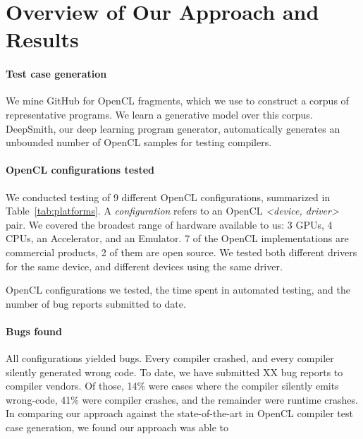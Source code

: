 \section{Overview of Our Approach and Results}\label{sec:overview}

\paragraph{Test case generation} We mine GitHub for OpenCL fragments, which we use to construct a corpus of representative programs. We learn a generative model over this corpus. DeepSmith, our deep learning program generator, automatically generates an unbounded number of OpenCL samples for testing compilers.

\paragraph{OpenCL configurations tested} We conducted testing of 9 different OpenCL configurations, summarized in Table~\ref{tab:platforms}. A \emph{configuration} refers to an OpenCL \emph{<device, driver>} pair. We covered the broadest range of hardware available to us: 3 GPUs, 4 CPUs, an Accelerator, and an Emulator. 7 of the OpenCL implementations are commercial products, 2 of them are open source. We tested both different drivers for the same device, and different devices using the same driver.


\begin{table*}[t!]
	\scriptsize %
	\centering %
	
	\caption{OpenCL configurations we tested, the time spent in automated testing, and the number of bug reports submitted to date.}
	\label{tab:platforms}
\end{table*}


\paragraph{Bugs found} All configurations yielded bugs. Every compiler crashed, and every compiler silently generated wrong code. To date, we have submitted XX bug reports to compiler vendors. Of those, 14\% were cases where the compiler silently emits wrong-code, 41\% were compiler crashes, and the remainder were runtime crashes. In comparing our approach against the state-of-the-art in OpenCL compiler test case generation, we found our approach was able to \cc{\ldots}